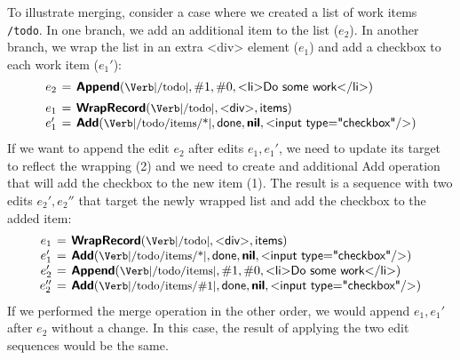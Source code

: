 \documentclass[sigconf]{acmart}
\newcommand{\note}[1]{}
\newcommand{\ident}[1]{{\sffamily #1}}
\newcommand{\srcid}[1]{\textnormal{\sffamily #1}}
\newcommand{\srckvd}[1]{\textnormal{\sffamily\bfseries #1}}
\begin{document}
%


To illustrate merging, consider a case where we created a list of work items {\small\Verb|/todo|}.
In one branch, we add an additional item to the list ($e_2$). In another branch, we wrap the
list in an extra \ident{<div>} element ($e_1$) and add a checkbox to each work item ($e_1'$):
%
\begin{equation*}
\arraycolsep=2pt
\begin{array}{rcl}
e_2 &=& \srckvd{Append}(\textnormal{\small\Verb|/todo|}, \#1, \#0, \srcid{<li>Do some work</li>})\\[0.5em]
e_1 &=& \srckvd{WrapRecord}(\textnormal{\small\Verb|/todo|}, \srcid{<div>}, \srcid{items})\\
e_1' &=& \srckvd{Add}(\textnormal{\small\Verb|/todo/items/*|}, \srcid{done}, \srckvd{nil}, \srcid{<input type="checkbox"/>})\\
\end{array}
\end{equation*}
%
If we want to append the edit $e_2$ after edits $e_1, e_1'$, we need to update its target to
reflect the wrapping (2) and we need to create and additional \ident{Add} operation
that will add the checkbox to the new item (1). The result is a sequence with two edits $e_2', e_2''$
that target the newly wrapped list and add the checkbox to the added item:
%
\begin{equation*}
\arraycolsep=2pt
\begin{array}{rcl}
  e_1 &=& \srckvd{WrapRecord}(\textnormal{\small\Verb|/todo|}, \srcid{<div>}, \srcid{items})\\
  e_1' &=& \srckvd{Add}(\textnormal{\small\Verb|/todo/items/*|}, \srcid{done}, \srckvd{nil}, \srcid{<input type="checkbox"/>})\\
e_2'  &=& \srckvd{Append}(\textnormal{\small\Verb|/todo/items|}, \#1, \#0, \srcid{<li>Do some work</li>})\\
e_2'' &=& \srckvd{Add}(\textnormal{\small\Verb|/todo/items/\#1|}, \srcid{done}, \srckvd{nil}, \srcid{<input type="checkbox"/>})\\
\end{array}
\end{equation*}
%
If we performed the merge operation in the other order, we would append $e_1, e_1'$ after
$e_2$ without a change. In this case, the result of applying the two edit sequences would be the
same.
\end{document}
